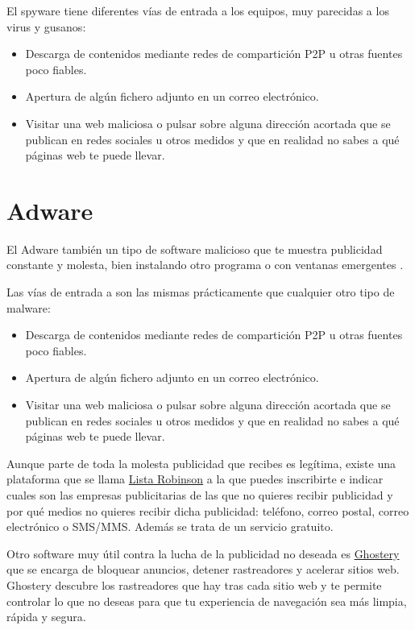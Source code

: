 \documentclass[
  spanish,
  a4paper,
  openany]{book}
\begin{document}
El spyware tiene diferentes vías de entrada a los equipos, muy parecidas a los virus y gusanos:

\begin{itemize}
\item
  Descarga de contenidos mediante redes de compartición P2P u otras fuentes poco fiables.
\item
  Apertura de algún fichero adjunto en un correo electrónico.
\item
  Visitar una web maliciosa o pulsar sobre alguna dirección acortada que se publican en redes sociales u otros medidos y que en realidad no sabes a qué páginas web te puede llevar.
\end{itemize}

\hypertarget{adware}{%
\section{Adware}\label{adware}}

El Adware también un tipo de software malicioso que te muestra publicidad constante y molesta, bien instalando otro programa o con ventanas emergentes \citep{AVAST-adware}.

Las vías de entrada a son las mismas prácticamente que cualquier otro tipo de malware:

\begin{itemize}
\item
  Descarga de contenidos mediante redes de compartición P2P u otras fuentes poco fiables.
\item
  Apertura de algún fichero adjunto en un correo electrónico.
\item
  Visitar una web maliciosa o pulsar sobre alguna dirección acortada que se publican en redes sociales u otros medidos y que en realidad no sabes a qué páginas web te puede llevar.
\end{itemize}

Aunque parte de toda la molesta publicidad que recibes es legítima, existe una plataforma que se llama \href{https://www.listarobinson.es/}{Lista Robinson} a la que puedes inscribirte e indicar cuales son las empresas publicitarias de las que no quieres recibir publicidad y por qué medios no quieres recibir dicha publicidad: teléfono, correo postal, correo electrónico o SMS/MMS. Además se trata de un servicio gratuito.

Otro software muy útil contra la lucha de la publicidad no deseada es \href{https://www.ghostery.com/}{Ghostery} que se encarga de bloquear anuncios, detener rastreadores y acelerar sitios web. Ghostery descubre los rastreadores que hay tras cada sitio web y te permite controlar lo que no deseas para que tu experiencia de navegación sea más limpia, rápida y segura.
\end{document}
